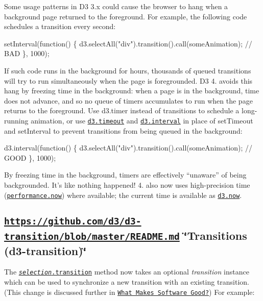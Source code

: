 Some usage patterns in D3 3.\+x could cause the browser to hang when a background page returned to the foreground. For example, the following code schedules a transition every second\+:


\begin{DoxyCode}
setInterval(function() \{
  d3.selectAll("div").transition().call(someAnimation); // BAD
\}, 1000);
\end{DoxyCode}


If such code runs in the background for hours, thousands of queued transitions will try to run simultaneously when the page is foregrounded. D3 4. avoids this hang by freezing time in the background\+: when a page is in the background, time does not advance, and so no queue of timers accumulates to run when the page returns to the foreground. Use d3.\+timer instead of transitions to schedule a long-\/running animation, or use \href{https://github.com/d3/d3-timer/blob/master/README.md#timeout}{\tt d3.\+timeout} and \href{https://github.com/d3/d3-timer/blob/master/README.md#interval}{\tt d3.\+interval} in place of set\+Timeout and set\+Interval to prevent transitions from being queued in the background\+:


\begin{DoxyCode}
d3.interval(function() \{
  d3.selectAll("div").transition().call(someAnimation); // GOOD
\}, 1000);
\end{DoxyCode}


By freezing time in the background, timers are effectively “unaware” of being backgrounded. It’s like nothing happened! 4. also now uses high-\/precision time (\href{https://developer.mozilla.org/en-US/docs/Web/API/Performance/now}{\tt performance.\+now}) where available; the current time is available as \href{https://github.com/d3/d3-timer/blob/master/README.md#now}{\tt d3.\+now}.

\subsection*{\href{https://github.com/d3/d3-transition/blob/master/README.md}{\tt https\+://github.\+com/d3/d3-\/transition/blob/master/\+R\+E\+A\+D\+M\+E.\+md} \char`\"{}\+Transitions (d3-\/transition)\char`\"{}}

The \href{https://github.com/d3/d3-transition/blob/master/README.md#selection_transition}{\tt {\itshape selection}.transition} method now takes an optional {\itshape transition} instance which can be used to synchronize a new transition with an existing transition. (This change is discussed further in \href{https://medium.com/@mbostock/what-makes-software-good-943557f8a488}{\tt What Makes Software Good?}) For example\+:


